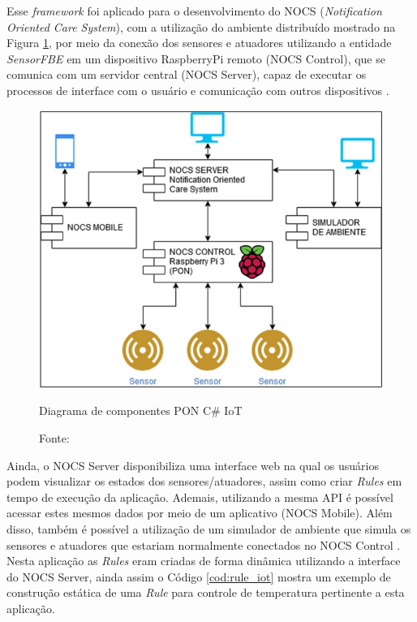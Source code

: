 Esse \textit{framework} foi aplicado para o desenvolvimento do NOCS
(\textit{Notification Oriented Care System}), com a utilização do ambiente
distribuído mostrado na Figura \ref{fig:pon_iot}, por meio da conexão dos
sensores e atuadores utilizando a entidade \textit{SensorFBE} em um dispositivo
RaspberryPi remoto (NOCS Control), que se comunica com um servidor central (NOCS
Server), capaz de executar os processos de interface com o usuário e comunicação
com outros dispositivos \cite{msc_oliveira_2019}. 

\begin{figure}[!htb]
  \centering
  \includegraphics[width=.55\textwidth]{../figures/pon_iot.png}
  \caption{Diagrama de componentes PON C\# IoT}
  \caption*{Fonte: }
  \label{fig:pon_iot}
\end{figure}

Ainda, o NOCS Server disponibiliza uma interface web na qual os usuários podem
visualizar os estados dos sensores/atuadores, assim como criar \textit{Rules} em
tempo de execução da aplicação. Ademais, utilizando a mesma API é possível acessar
estes mesmos dados por meio de um aplicativo (NOCS Mobile). Além disso, também é
possível a utilização de um simulador de ambiente que simula os sensores e
atuadores que estariam normalmente conectados no NOCS Control
\cite{msc_oliveira_2019}. Nesta aplicação as \textit{Rules} eram criadas de forma
dinâmica utilizando a interface do NOCS Server, ainda assim o Código
\ref{cod:rule_iot} mostra um exemplo de construção estática de uma \textit{Rule}
para controle de temperatura pertinente a esta aplicação.

